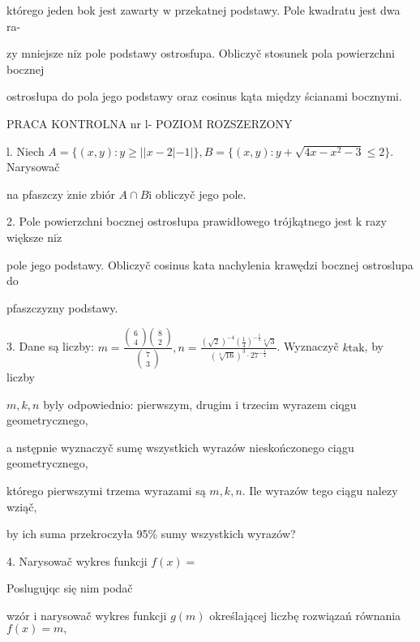 \documentclass[a4paper,12pt]{article}
\begin{document}
którego jeden bok jest zawarty $\mathrm{w}$ przekatnej podstawy. Pole kwadratu jest dwa ra-

zy mniejsze $\mathrm{n}\mathrm{i}\dot{\mathrm{z}}$ pole podstawy ostrosfupa. Obliczyč stosunek pola powierzchni bocznej

ostrosłupa do pola jego podstawy oraz cosinus kąta między ścianami bocznymi.




PRACA KONTROLNA nr l- POZIOM ROZSZERZONY

l. Niech $A=\{(x,y):y\geq||x-2|-1|\}, B=\{(x,y):y+\sqrt{4x-x^{2}-3}\leq 2\}$. Narysowač

na pfaszczy $\acute{\mathrm{z}}\mathrm{n}\mathrm{i}\mathrm{e}$ zbiór $A\cap B\mathrm{i}$ obliczyč jego pole.

2. Pole powierzchni bocznej ostrosłupa prawidłowego trójkątnego jest $\mathrm{k}$ razy większe $\mathrm{n}\mathrm{i}\dot{\mathrm{z}}$

pole jego podstawy. Obliczyč cosinus kata nachylenia krawędzi bocznej ostroslupa do

pfaszczyzny podstawy.

3. Dane są liczby: $m = \displaystyle \frac{\left(\begin{array}{l}
6\\
4
\end{array}\right)\left(\begin{array}{l}
8\\
2
\end{array}\right)}{\left(\begin{array}{l}
7\\
3
\end{array}\right)}, n = \displaystyle \frac{(\sqrt{2})^{-4}(\frac{1}{4})^{-\frac{5}{2}}\sqrt[4]{3}}{(\sqrt[4]{16})^{3}\cdot 27^{-\frac{1}{4}}}$. Wyznaczyč $k \mathrm{t}\mathrm{a}\mathrm{k}$, by liczby

$m, k, n$ byly odpowiednio: pierwszym, drugim $\mathrm{i}$ trzecim wyrazem ciqgu geometrycznego,

a nstępnie wyznaczyč sumę wszystkich wyrazów nieskończonego ciągu geometrycznego,

którego pierwszymi trzema wyrazami są $m, k, n$. Ile wyrazów tego ciągu nalezy wziąč,

by ich suma przekroczyła 95\% sumy wszystkich wyrazów?

4. Narysowač wykres funkcji $f(x)=$ 

Poslugujqc się nim podač

wzór $\mathrm{i}$ narysowač wykres funkcji $g(m)$ określającej liczbę rozwiązań równania $f(x)=m,$
\end{document}
